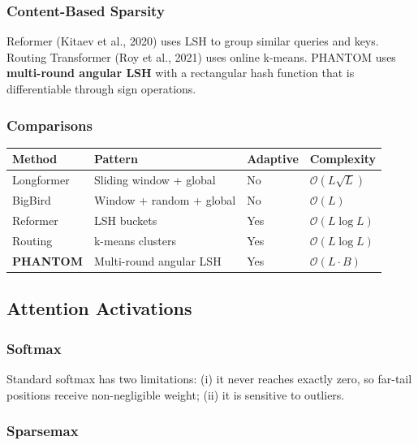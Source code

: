 \subsubsection{Content-Based Sparsity}

Reformer (Kitaev et al., 2020) uses LSH to group similar queries and keys. 
Routing Transformer (Roy et al., 2021) uses online k-means. PHANTOM uses 
\textbf{multi-round angular LSH} with a rectangular hash function that is 
differentiable through sign operations.

\subsubsection{Comparisons}

\begin{table}[H]
\centering
\small
\begin{tabular}{llll}
\toprule
\textbf{Method} & \textbf{Pattern} & \textbf{Adaptive} & \textbf{Complexity} \\
\midrule
Longformer & Sliding window + global & No & $\mathcal{O}(L \sqrt{L})$ \\
BigBird & Window + random + global & No & $\mathcal{O}(L)$ \\
Reformer & LSH buckets & Yes & $\mathcal{O}(L \log L)$ \\
Routing & k-means clusters & Yes & $\mathcal{O}(L \log L)$ \\
\textbf{PHANTOM} & Multi-round angular LSH & Yes & $\mathcal{O}(L \cdot B)$ \\
\bottomrule
\end{tabular}
\end{table}

\subsection{Attention Activations}

\subsubsection{Softmax}

Standard softmax has two limitations: (i) it never reaches exactly zero, so 
far-tail positions receive non-negligible weight; (ii) it is sensitive to 
outliers.

\subsubsection{Sparsemax}

